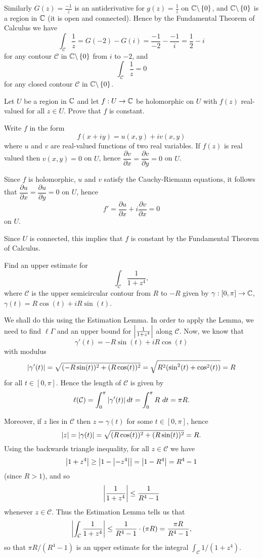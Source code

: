 \begin{questions}
\begin{answer}
Similarly $G(z) = \frac{-1}{z}$ is an antiderivative for $g(z) = \frac{1}{z}$ on $\mathbb{C} \backslash \left\{0\right\}$, and $\mathbb{C} \backslash \left\{0\right\}$ is a region in $\mathbb{C}$ (it is open and connected).  Hence by the Fundamental Theorem of Calculus we have
\[
\int_{\mathcal{C}} \frac{1}{z} = G(-2)-G(i) = \frac{-1}{-2} - \frac{-1}{i} = \frac{1}{2} -i
\]
for any contour $\mathcal{C}$ in $\mathbb{C} \backslash \left\{0\right\}$ from $i$ to $-2$, and
\[
\int_{\mathcal{C}} \frac{1}{z} =0
\]
for any closed contour $\mathcal{C}$ in $\mathbb{C} \backslash \left\{0\right\}$.

\end{answer}
\question Let $U$ be a region in $\mathbb{C}$ and let $f:U \to \mathbb{C}$ be holomorphic on $U$ with $f(z)$ real-valued for all $z \in U$.  Prove that $f$ is constant.
\begin{answer}
Write $f$ in the form
\[
f(x+iy)=u(x,y)+iv(x,y)
\]
where $u$ and $v$ are real-valued functions of two real variables.
If $f(z)$ is real valued then $v(x,y)=0$ on $U$, hence $\dfrac{\partial v }{\partial x} = \dfrac{\partial v}{\partial y}=0$ on $U$.

Since $f$ is holomorphic, $u$ and $v$ satisfy the Cauchy-Riemann equations, it follows that $\dfrac{\partial u}{\partial x} = \dfrac{\partial u}{\partial y}=0$ on $U$, hence
\[
f' = \frac{\partial u}{\partial x} + i \frac{\partial v}{\partial x} = 0
\]
on $U$. 

Since $U$ is connected, this implies that $f$ is constant by the Fundamental Theorem of Calculus.
\end{answer}


\question Find an upper estimate for
\[
\int_{\mathcal{C}} \frac{1}{1+z^4},
\]
where $\mathcal{C}$ is the upper semicircular contour from $R$ to $-R$ given by $\gamma:[0,\pi] \to \mathbb{C}$, $\gamma (t) = R \cos(t)+iR \sin (t)$.

\begin{answer}
We shall do this using the Estimation Lemma.  In order to apply the Lemma, we need to find $\ell{\Gamma}$ and an upper bound for $\left| \frac{1}{1+z^4} \right|$ along $\mathcal{C}$.  Now, we know that
\[
\gamma '(t) = -R \sin(t) +i R \cos(t)
\]
with modulus
\[
\left| \gamma'(t) \right| = \sqrt{ (-R\sin(t))^2+(R\cos(t))^2} = \sqrt{R^2(\sin^2(t)+\cos^2(t))} = R
\]
for all $t \in [0,\pi]$.  Hence the length of $\mathcal{C}$ is given by
\[
\ell(\mathcal{C})=\int_0^{\pi} \left| \gamma'(t) \right| dt = \int_0^{\pi} R \ dt =\pi R.
\] 

Moreover, if $z$ lies in $\mathcal{C}$ then $z=\gamma(t)$ for some $t \in [0,\pi]$, hence
\[
\left| z \right| = \left| \gamma(t) \right| = \sqrt{(R\cos(t))^2+(R\sin(t))^2} = R.
\]
Using the backwards triangle inequality, for all $z \in \mathcal{C}$ we have
\[
\left| 1+z^4 \right| \geq \left| 1-\left| -z^4 \right| \right| = \left| 1-R^4 \right| = R^4-1
\]
(since $R>1$), and so
\[
\left| \frac{1}{1+z^4} \right| \leq \frac{1}{R^4-1}
\]
whenever $z \in \mathcal{C}$.  Thus the Estimation Lemma tells us that
\[
\left| \int_{\mathcal{C}} \frac{1}{1+z^4} \right| \leq \frac{1}{R^4-1} \cdot (\pi R) = \frac{\pi R}{R^4-1},
\]
so that $\pi R/(R^4-1)$ is an upper estimate for the integral $\int_{\mathcal{C}} 1/(1+z^4)$.



\end{answer}
\end{questions}
